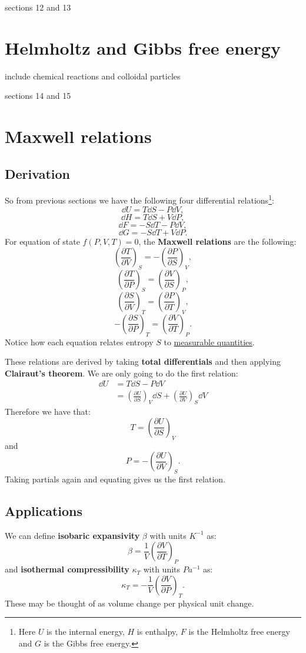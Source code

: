\documentclass{article}
\begin{document}
sections 12 and 13

\newpage

\section{Helmholtz and Gibbs free energy}
include chemical reactions and colloidal particles

sections 14 and 15


\newpage
    

\section{Maxwell relations}

\subsection{Derivation}
So from previous sections we have the following four differential relations\footnote{Here $U$ is the internal energy, $H$ is enthalpy, $F$ is the Helmholtz free energy and $G$ is the Gibbs free energy.}:
$$\dd U=T\dd S-P\dd V,$$
$$\dd H=T\dd S+V\dd P,$$
$$\dd F=-S\dd T-P\dd V,$$
$$\dd G=-S\dd T+V\dd P.$$
For equation of state $f(P,V,T)=0$, the \textbf{Maxwell relations} are the following:
$$\left(\frac{\partial T}{\partial V}\right)_S=-\left(\frac{\partial P}{\partial S}\right)_V,$$
$$\left(\frac{\partial T}{\partial P}\right)_S=\left(\frac{\partial V}{\partial S}\right)_P,$$
$$\left(\frac{\partial S}{\partial V}\right)_T=\left(\frac{\partial P}{\partial T}\right)_V,$$
$$-\left(\frac{\partial S}{\partial P}\right)_T=\left(\frac{\partial V}{\partial T}\right)_P.$$
Notice how each equation relates entropy $S$ to \underline{measurable quantities}.

These relations are derived by taking \textbf{total differentials} and then applying \textbf{Clairaut's theorem}. We are only going to do the first relation:    
\begin{align*}
    \dd U
    &= T\dd S-P\dd V\\
    &= \left(\frac{\partial U}{\partial S}\right)_V \dd S
    + \left(\frac{\partial U}{\partial V}\right)_S \dd V
\end{align*}
Therefore we have that:
$$T=\left(\frac{\partial U}{\partial S}\right)_V$$
and 
$$P=-\left(\frac{\partial U}{\partial V}\right)_S.$$
Taking partials again and equating gives us the first relation.

\newpage

\subsection{Applications}
We can define \textbf{isobaric expansivity} $\beta$ with units $K^{-1}$ as:
$$\beta=\frac{1}{V}
\left(\frac{\partial V}{\partial T}\right)_P$$
and \textbf{isothermal compressibility} $\kappa_T$ with units $Pa^{-1}$ as:
$$\kappa_T=-\frac{1}{V}
\left(\frac{\partial V}{\partial P}\right)_T.$$
These may be thought of as volume change per physical unit change.
\end{document}
